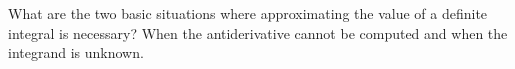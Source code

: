 {What are the two basic situations where approximating the value of a definite integral is necessary?}
{When the antiderivative cannot be computed and when the integrand is unknown.
}